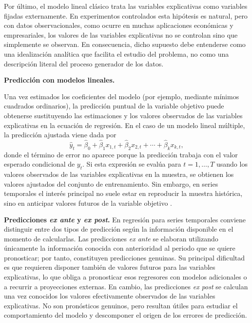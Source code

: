 \documentclass[12pt]{report} %
\begin{document}
Por último, el modelo lineal clásico trata las variables explicativas como variables fijadas externamente. En experimentos controlados esta hipótesis es natural, pero con datos observacionales, como ocurre en muchas aplicaciones económicas y empresariales, los valores de las variables explicativas no se controlan sino que simplemente se observan. En consecuencia, dicho supuesto debe entenderse como una idealización analítica que facilita el estudio del problema, no como una descripción literal del proceso generador de los datos.

\textbf{Predicción con modelos lineales.}

Una vez estimados los coeficientes del modelo (por ejemplo, mediante mínimos cuadrados ordinarios), la predicción puntual de la variable objetivo puede obtenerse sustituyendo las estimaciones y los valores observados de las variables explicativas en la ecuación de regresión. En el caso de un modelo lineal múltiple, la predicción ajustada viene dada por
\begin{equation}
    \hat{y}_t = \hat{\beta}_0 + \hat{\beta}_1 x_{1,t} + \hat{\beta}_2 x_{2,t} + \cdots + \hat{\beta}_k x_{k,t},
    \label{eq:linear_fitted_values}
\end{equation}
donde el término de error no aparece porque la predicción trabaja con el valor esperado condicional de $y_t$. Si esta expresión se evalúa para $t = 1, \ldots, T$ usando los valores observados de las variables explicativas en la muestra, se obtienen los valores ajustados del conjunto de entrenamiento. Sin embargo, en series temporales el interés principal no suele estar en reproducir la muestra histórica, sino en anticipar valores futuros de la variable objetivo \cite{Hyndman2021}.

\textbf{Predicciones \textit{ex ante} y \textit{ex post}.} En regresión para series temporales conviene distinguir entre dos tipos de predicción según la información disponible en el momento de calcularlas. Las predicciones \textit{ex ante} se elaboran utilizando únicamente la información conocida con anterioridad al periodo que se quiere pronosticar; por tanto, constituyen predicciones genuinas. Su principal dificultad es que requieren disponer también de valores futuros para las variables explicativas, lo que obliga a pronosticar esos regresores con modelos adicionales o a recurrir a proyecciones externas. En cambio, las predicciones \textit{ex post} se calculan una vez conocidos los valores efectivamente observados de las variables explicativas. No son pronósticos genuinos, pero resultan útiles para estudiar el comportamiento del modelo y descomponer el origen de los errores de predicción.
\end{document}
